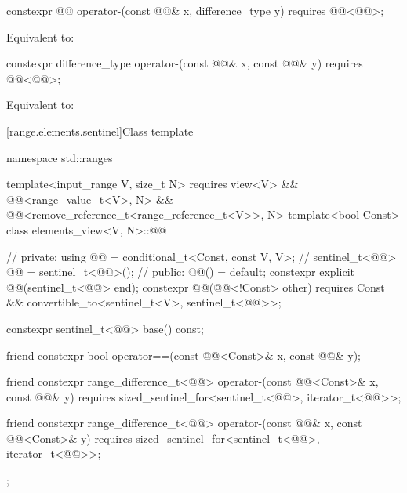 %
\begin{itemdecl}
constexpr @@ operator-(const @@& x, difference_type y)
  requires @@<@@>;
\end{itemdecl}

\begin{itemdescr}
\pnum
\effects
Equivalent to: 
\end{itemdescr}

%
\begin{itemdecl}
constexpr difference_type operator-(const @@& x, const @@& y)
  requires @@<@@>;
\end{itemdecl}

\begin{itemdescr}
\pnum
\effects
Equivalent to: 
\end{itemdescr}

[range.elements.sentinel]{Class template }

%
\begin{codeblock}
namespace std::ranges {
  template<input_range V, size_t N>
    requires view<V> && @@<range_value_t<V>, N> &&
             @@<remove_reference_t<range_reference_t<V>>, N>
  template<bool Const>
  class elements_view<V, N>::@@ {                 // \expos
  private:
    using @@ = conditional_t<Const, const V, V>;      // \expos
    sentinel_t<@@> @@ = sentinel_t<@@>();         // \expos
  public:
    @@() = default;
    constexpr explicit @@(sentinel_t<@@> end);
    constexpr @@(@@<!Const> other)
      requires Const && convertible_to<sentinel_t<V>, sentinel_t<@@>>;

    constexpr sentinel_t<@@> base() const;

    friend constexpr bool operator==(const @@<Const>& x, const @@& y);

    friend constexpr range_difference_t<@@>
      operator-(const @@<Const>& x, const @@& y)
        requires sized_sentinel_for<sentinel_t<@@>, iterator_t<@@>>;

    friend constexpr range_difference_t<@@>
      operator-(const @@& x, const @@<Const>& y)
        requires sized_sentinel_for<sentinel_t<@@>, iterator_t<@@>>;
  };
}
\end{codeblock}

